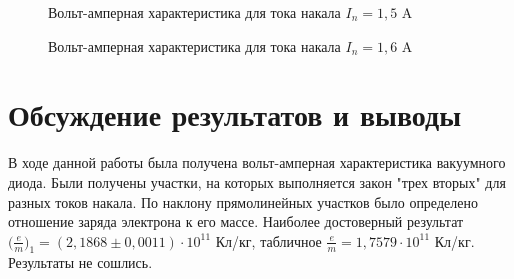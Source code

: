 \documentclass[a4paper,12pt]{article}
\begin{document}
\begin{figure} 
	\centering
	\caption{Вольт-амперная характеристика для тока накала $I_n = 1,5$ A}
	\label{mah}
\end{figure}

\begin{figure} 
	\centering
	\caption{Вольт-амперная характеристика для тока накала $I_n = 1,6$ A}
	\label{mah}
\end{figure}

\section{Обсуждение результатов и выводы}
\par В ходе данной работы была получена вольт-амперная характеристика вакуумного диода. Были получены участки, на которых выполняется закон "трех вторых" для разных токов накала. По наклону прямолинейных участков было определено отношение заряда электрона к его массе. Наиболее достоверный результат $\big(\frac{e}{m}\big)_1 = (2,1868 \pm 0,0011) \cdot 10^{11}$ Кл/кг, табличное  $\frac{e}{m} = 1,7579 \cdot 10^{11}$ Кл/кг. Результаты не сошлись.
\end{document}
